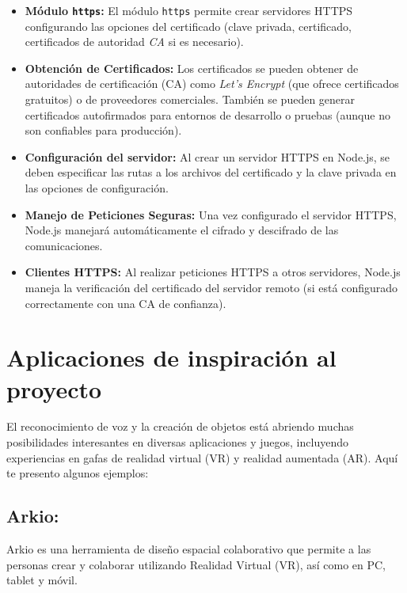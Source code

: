 \documentclass[a4paper, 12pt]{book}
\let\cleardoublepage\clearpage
\begin{document}
\begin{itemize}
 \item \textbf{Módulo \texttt{https}:} El módulo \texttt{https} permite crear servidores HTTPS configurando las opciones del certificado (clave privada, certificado, certificados de autoridad \textit{CA} si es necesario).
 \item \textbf{Obtención de Certificados:} Los certificados se pueden obtener de autoridades de certificación (CA) como \textit{Let's Encrypt} (que ofrece certificados gratuitos) o de proveedores comerciales. También se pueden generar certificados autofirmados para entornos de desarrollo o pruebas (aunque no son confiables para producción).
 \item \textbf{Configuración del servidor:} Al crear un servidor HTTPS en Node.js, se deben especificar las rutas a los archivos del certificado y la clave privada en las opciones de configuración.
 \item \textbf{Manejo de Peticiones Seguras:} Una vez configurado el servidor HTTPS, Node.js manejará automáticamente el cifrado y descifrado de las comunicaciones.
 \item \textbf{Clientes HTTPS:} Al realizar peticiones HTTPS a otros servidores, Node.js maneja la verificación del certificado del servidor remoto (si está configurado correctamente con una CA de confianza).
\end{itemize}

\cleardoublepage
\section{Aplicaciones de inspiración al proyecto } 
\label{sec:seccion10}
El reconocimiento de voz y la creación de objetos está abriendo muchas posibilidades interesantes en diversas aplicaciones y juegos, incluyendo experiencias en gafas de realidad virtual (VR) y realidad aumentada (AR). Aquí te presento algunos ejemplos:

\subsection{Arkio:}

Arkio es una herramienta de diseño espacial colaborativo que permite a las personas crear y colaborar utilizando Realidad Virtual (VR), así como en PC, tablet y móvil.
\end{document}
